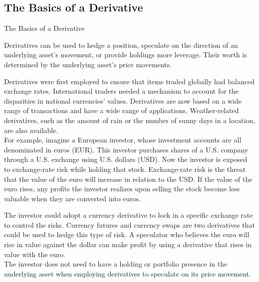 \documentclass[unknownkeysallowed, compress]{beamer}
\theoremstyle{plain}
\begin{document}
\subsection{The Basics of a Derivative}
\begin{frame}[allowframebreaks]{The Basics of a Derivative}
\noindent
\par Derivatives can be used to hedge a position, speculate on the direction of an
underlying asset's movement, or provide holdings more leverage. Their worth is
determined by the underlying asset's price movements.\\
\par Derivatives were first employed to ensure that items traded globally had balanced
exchange rates. International traders needed a mechanism to account for the disparities
in national currencies' values. Derivatives are now based on a wide range of transactions
and have a wide range of applications. Weather-related derivatives, such as the amount
of rain or the number of sunny days in a location, are also available.\\
For example, imagine a European investor, whose investment accounts are all
denominated in euros (EUR). This investor purchases shares of a U.S. company through a
U.S. exchange using U.S. dollars (USD). Now the investor is exposed to exchange-rate risk
while holding that stock. Exchange-rate risk is the threat that the value of the euro will
increase in relation to the USD. If the value of the euro rises, any profits the investor
realizes upon selling the stock become less valuable when they are converted into euros.\\
\par The investor could adopt a currency derivative to lock in a specific exchange rate to
control the risks. Currency futures and currency swaps are two derivatives that could be
used to hedge this type of risk. A speculator who believes the euro will rise in value
against the dollar can make profit by using a derivative that rises in value with the euro.\\
The investor does not need to have a holding or portfolio presence in the underlying
asset when employing derivatives to speculate on its price movement.

\end{frame}
\end{document}
